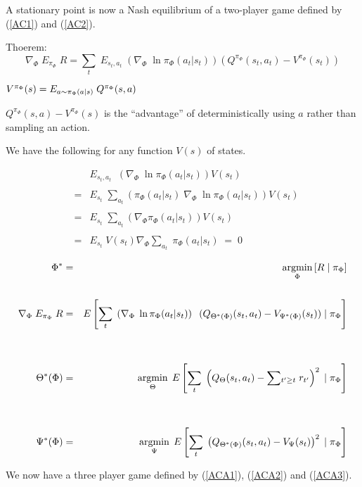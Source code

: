 {A stationary point is now a Nash equilibrium of a two-player game defined by (\ref{AC1}) and (\ref{AC2}).



Thoerem:
$$\nabla_\Phi \;E_{\pi_\Phi}\; R = \sum_t\;E_{s_t,a_t} \; \left(\nabla_\Phi \;\ln \pi_\Phi(a_t|s_t)\right)(Q^{\pi_\Phi}(s_t,a_t) - V^{\pi_\Phi}(s_t))$$

\vfill
$V^{\pi_\Phi}(s) = E_{a \sim \pi_\Phi(a|s)}\;Q^{\pi_\Phi}(s,a)$

\vfill
$Q^{\pi_\Phi}(s,a) - V^{\pi_\Phi}(s)$ is the ``advantage'' of deterministically using $a$ rather than sampling an action.


We have the following for any function $V(s)$ of states.

\begin{eqnarray*}
 & & E_{s_t,a_t} \;  \; \left(\nabla_\Phi \;\ln \pi_\Phi(a_t|s_t)\right) V(s_t) \\
 \\
 & = & E_{s_t} \;  \sum_{a_t} \left(\pi_\Phi(a_t|s_t) \;\nabla_\Phi \;\ln \pi_\Phi(a_t|s_t)\right) V(s_t) \\
 \\
 & = & E_{s_t} \;  \sum_{a_t} \left(\nabla_\Phi \pi_\Phi(a_t|s_t)\right) V(s_t) \\
 \\
 & = & E_{s_t} \;  V(s_t) \nabla_\Phi \sum_{a_t}\; \pi_\Phi(a_t|s_t) \;=\; 0
\end{eqnarray*}



{\huge
\begin{eqnarray}
  \Phi^* & = & \operatorname*{argmin}_\Phi\left[R\;|\;\pi_\Phi\right] \label{ACA1} \\
  \nonumber \\
  \nabla_\Phi \;E_{\pi_\Phi}\;R   & = & E\left[ \sum_t\; \left(\nabla_\Phi \;\ln \pi_\Phi(a_t|s_t)\right) \;\;(Q_{\Theta^*(\Phi)}(s_t,a_t) - V_{\Psi^*(\Phi)}(s_t))\;|\; \pi_\Phi\right] \nonumber \\
  \nonumber \\
  \nonumber \\
  \Theta^*(\Phi) & = & \operatorname*{argmin}_\Theta\; E\left[\sum_t\;\left(Q_\Theta(s_t,a_t) - \sum \!_{t' \geq t}\; r_{t'}\right)^2 \;|\;\pi_\Phi\right] \label{ACA2} \\
  \nonumber \\
  \nonumber \\
  \Psi^*(\Phi) & = & \operatorname*{argmin}_\Psi\;E\left[\sum_t\;\left(Q_{\Theta^*(\Phi)}(s_t,a_t) - V_\Psi(s_t)\right)^2 \;|\;\pi_\Phi\right] \label{ACA3}
\end{eqnarray}

We now have a three player game defined by (\ref{ACA1}), (\ref{ACA2}) and (\ref{ACA3}).
}

}
